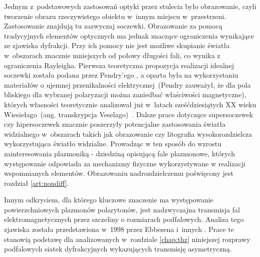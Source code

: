 
Jednym z~podstawowych zastosowań optyki przez stulecia było obrazowanie, czyli tworzenie obrazu rzeczywistego obiektu w~innym miejscu w~przestrzeni. Zastosowanie znajdują tu zazwyczaj soczewki. Obrazowanie za pomocą tradycyjnych elementów optycznych ma jednak znaczące ograniczenia wynikające ze zjawiska dyfrakcji. Przy ich pomocy nie jest możliwe skupianie światła w~obszarach znacznie mniejszych od połowy długości fali, co wynika z ograniczenia Rayleigha. Pierwsza teoretyczna propozycja realizacji idealnej soczewki została podana przez Pendry'ego \cite{PhysRevLett.85.3966,loschialpo2003electromagnetic,smith2003limitations,ramakrishna2002asymmetric}, a oparta była na wykorzystaniu materiałów o ujemnej przenikalności elektrycznej~(Pendry zauważył, że dla pola bliskiego dla wybranej polaryzacji można zaniedbać właściwości magnetyczne), których własności teoretycznie analizował już w~latach sześćdziesiątych XX wieku Wiesiełago~(ang. transkrypcja Veselago)~\cite{veselago1968electrodynamics}. Dalsze prace dotyczące supersoczewek czy hipersoczewek \cite{liu2007far,jacob2006optical,jacob2007semiclassical,ma2010advances,rho2010spherical} znacznie poszerzyły potencjalne zastosowania światła widzialnego w~obszarach takich jak obrazowanie czy litografia wysokorozdzielcza wykorzystująca światło widzialne. Prowadząc w ten sposób do wzrostu zainteresowania plazmoniką - dziedziną opisującą fale plazmonowe, których występowanie odpowiada za mechanizmy fizyczne wykorzystywane w realizacji wspomnianych elementów. Obrazowaniu nadrozdzielczemu poświęcony jest rozdział \ref{art:nondiff}.
 
Innym odkryciem, dla którego kluczowe znaczenie ma występowanie powierzchniowych plazmonów polarytonów, jest nadzwyczajna transmisja fal elektromagnetycznych przez szczeliny o rozmiarach podfalowych. Analiza tego zjawiska została przedstawiona w~1998 przez Ebbesena i~innych \cite{ebbesen1998extraordinary}. Prace te stanowią podstawę dla analizowanych w~rozdziale \ref{chap:thz} niniejszej rozprawy podfalowych siatek dyfrakcyjnych wykazujących transmisję asymetryczną.

